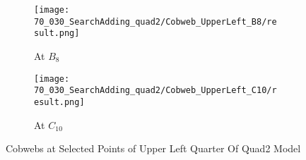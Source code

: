 \begin{figure}
    \centering
    \begin{subfigure}{0.4\textwidth}
        \centering
        \texttt{[image: 70\_030\_SearchAdding\_quad2/Cobweb\_UpperLeft\_B8/result.png]}
        \caption{At $B_{8}$}
    \end{subfigure}
    \begin{subfigure}{0.4\textwidth}
        \centering
        \texttt{[image: 70\_030\_SearchAdding\_quad2/Cobweb\_UpperLeft\_C10/result.png]}
        \caption{At $C_{10}$}
    \end{subfigure}
    \caption{Cobwebs at Selected Points of Upper Left Quarter Of Quad2 Model}
\end{figure}